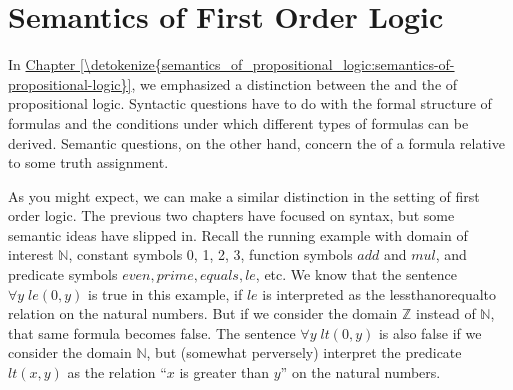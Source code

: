 \documentclass[letterpaper,10pt,english]{sphinxmanual}
\begin{document}
\begin{enumerate}
\begin{sphinxVerbatim}[commandchars=\\\{\}]
 
 
 
 

       
                     
\end{sphinxVerbatim}

\end{enumerate}


\chapter{Semantics of First Order Logic}
\label{\detokenize{semantics_of_first_order_logic:semantics-of-first-order-logic}}\label{\detokenize{semantics_of_first_order_logic:id1}}\label{\detokenize{semantics_of_first_order_logic::doc}}
\sphinxAtStartPar
In \hyperref[\detokenize{semantics_of_propositional_logic:semantics-of-propositional-logic}]{Chapter \ref{\detokenize{semantics_of_propositional_logic:semantics-of-propositional-logic}}}, we emphasized a distinction between the  and the  of propositional logic. Syntactic questions have to do with the formal structure of formulas and the conditions under which different types of formulas can be derived. Semantic questions, on the other hand, concern the  of a formula relative to some truth assignment.

\sphinxAtStartPar
As you might expect, we can make a similar distinction in the setting of first order logic. The previous two chapters have focused on syntax, but some semantic ideas have slipped in. Recall the running example with domain of interest \({\mathbb N}\), constant symbols 0, 1, 2, 3, function symbols \(\mathit{add}\) and \(\mathit{mul}\), and predicate symbols \(\mathit{even}, \mathit{prime}, \mathit{equals}, \mathit{le}\), etc. We know that the sentence \(\forall y \; \mathit{le}(0, y)\) is true in this example, if \(\mathit{le}\) is interpreted as the less\sphinxhyphen{}than\sphinxhyphen{}or\sphinxhyphen{}equal\sphinxhyphen{}to relation on the natural numbers. But if we consider the domain \({\mathbb Z}\) instead of \({\mathbb N}\), that same formula becomes false. The sentence \(\forall y \; \mathit{lt}(0,y)\) is also false if we consider the domain \({\mathbb N}\), but (somewhat perversely) interpret the predicate \(\mathit{lt}(x, y)\) as the relation “\(x\) is greater than \(y\)” on the natural numbers.
\end{document}
